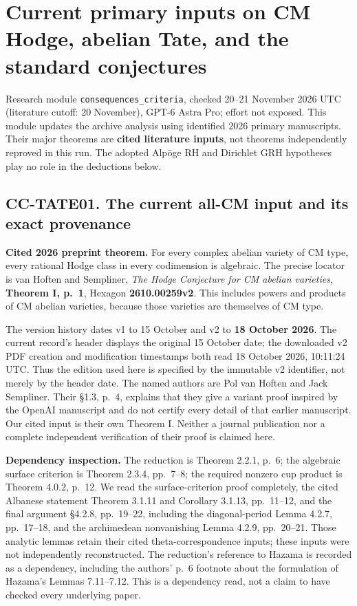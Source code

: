 \section{Current primary inputs on CM Hodge, abelian Tate, and the
standard
conjectures}\label{current-primary-inputs-on-cm-hodge-abelian-tate-and-the-standard-conjectures}

Research module \texttt{consequences\_criteria}, checked 20--21 November
2026 UTC (literature cutoff: 20 November), GPT-6 Astra Pro; effort not
exposed. This module updates the archive analysis using identified 2026
primary manuscripts. Their major theorems are \textbf{cited literature
inputs}, not theorems independently reproved in this run. The adopted
Alpöge RH and Dirichlet GRH hypotheses play no role in the deductions
below.

\subsection{CC-TATE01. The current all-CM input and its exact
provenance}\label{cc-tate01.-the-current-all-cm-input-and-its-exact-provenance}

\textbf{Cited 2026 preprint theorem.} For every complex abelian variety
of CM type, every rational Hodge class in every codimension is
algebraic. The precise locator is van Hoften and Sempliner, \emph{The
Hodge Conjecture for CM abelian varieties}, \textbf{Theorem I, p.~1},
Hexagon \textbf{2610.00259v2}. This includes powers and products of CM
abelian varieties, because those varieties are themselves of CM type.

The version history dates v1 to 15 October and v2 to \textbf{18 October
2026}. The current record's header displays the original 15 October
date; the downloaded v2 PDF creation and modification timestamps both
read 18 October 2026, 10:11:24 UTC. Thus the edition used here is
specified by the immutable v2 identifier, not merely by the header date.
The named authors are Pol van Hoften and Jack Sempliner. Their §1.3,
p.~4, explains that they give a variant proof inspired by the OpenAI
manuscript and do not certify every detail of that earlier manuscript.
Our cited input is their own Theorem I. Neither a journal publication
nor a complete independent verification of their proof is claimed here.

\textbf{Dependency inspection.} The reduction is Theorem 2.2.1, p.~6;
the algebraic surface criterion is Theorem 2.3.4, pp.~7--8; the required
nonzero cup product is Theorem 4.0.2, p.~12. We read the
surface-criterion proof completely, the cited Albanese statement Theorem
3.1.11 and Corollary 3.1.13, pp.~11--12, and the final argument §4.2.8,
pp.~19--22, including the diagonal-period Lemma 4.2.7, pp.~17--18, and
the archimedean nonvanishing Lemma 4.2.9, pp.~20--21. Those analytic
lemmas retain their cited theta-correspondence inputs; these inputs were
not independently reconstructed. The reduction's reference to Hazama is
recorded as a dependency, including the authors' p.~6 footnote about the
formulation of Hazama's Lemmas 7.11--7.12. This is a dependency read,
not a claim to have checked every underlying paper.


